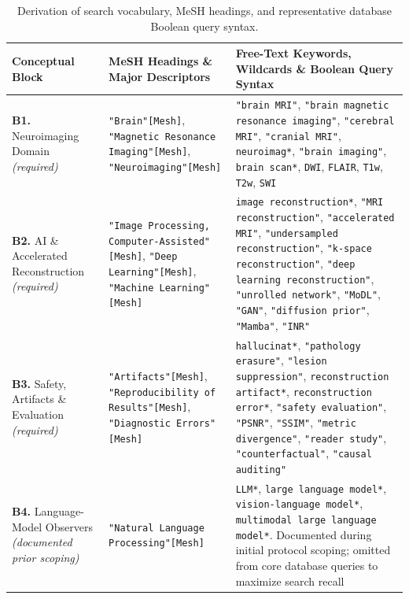 \documentclass[11pt]{article}
\begin{document}
\begin{table}[t]
\centering
\caption{Derivation of search vocabulary, MeSH headings, and representative database Boolean query syntax.}
\label{tab:keywords}
\small
\setlength{\tabcolsep}{4pt}
\renewcommand{\arraystretch}{1.18}
\begin{tabular}{>{\raggedright\arraybackslash}p{} >{\raggedright\arraybackslash}p{} >{\raggedright\arraybackslash}p{}}
\hline
\textbf{Conceptual Block} & \textbf{MeSH Headings \& Major Descriptors} & \textbf{Free-Text Keywords, Wildcards \& Boolean Query Syntax} \\
\hline
\textbf{B1.} Neuroimaging Domain \newline \emph{(required)} & \texttt{"Brain"[Mesh]}, \texttt{"Magnetic Resonance Imaging"[Mesh]}, \texttt{"Neuroimaging"[Mesh]} & \texttt{"brain MRI"}, \texttt{"brain magnetic resonance imaging"}, \texttt{"cerebral MRI"}, \texttt{"cranial MRI"}, \texttt{neuroimag*}, \texttt{"brain imaging"}, \texttt{brain scan*}, \texttt{DWI}, \texttt{FLAIR}, \texttt{T1w}, \texttt{T2w}, \texttt{SWI} \\
\hline
\textbf{B2.} AI \& Accelerated Reconstruction \newline \emph{(required)} & \texttt{"Image Processing, Computer-Assisted"[Mesh]}, \texttt{"Deep Learning"[Mesh]}, \texttt{"Machine Learning"[Mesh]} & \texttt{image reconstruction*}, \texttt{"MRI reconstruction"}, \texttt{"accelerated MRI"}, \texttt{"undersampled reconstruction"}, \texttt{"k-space reconstruction"}, \texttt{"deep learning reconstruction"}, \texttt{"unrolled network"}, \texttt{"MoDL"}, \texttt{"GAN"}, \texttt{"diffusion prior"}, \texttt{"Mamba"}, \texttt{"INR"} \\
\hline
\textbf{B3.} Safety, Artifacts \& Evaluation \newline \emph{(required)} & \texttt{"Artifacts"[Mesh]}, \texttt{"Reproducibility of Results"[Mesh]}, \texttt{"Diagnostic Errors"[Mesh]} & \texttt{hallucinat*}, \texttt{"pathology erasure"}, \texttt{"lesion suppression"}, \texttt{reconstruction artifact*}, \texttt{reconstruction error*}, \texttt{"safety evaluation"}, \texttt{"PSNR"}, \texttt{"SSIM"}, \texttt{"metric divergence"}, \texttt{"reader study"}, \texttt{"counterfactual"}, \texttt{"causal auditing"} \\
\hline
\textbf{B4.} Language-Model Observers \newline \emph{(documented prior scoping)} & \texttt{"Natural Language Processing"[Mesh]} & \texttt{LLM*}, \texttt{large language model*}, \texttt{vision-language model*}, \texttt{multimodal large language model*}. Documented during initial protocol scoping; omitted from core database queries to maximize search recall \\

\end{tabular}
\end{table}
\end{document}
